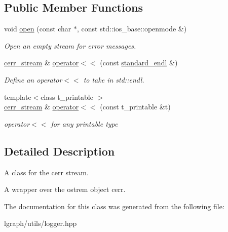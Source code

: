 \subsection*{Public Member Functions}
\begin{DoxyCompactItemize}
\item 
void \hyperlink{classlgraph_1_1utils_1_1cerr__stream_aaec9df1b58756fcda596e29bbfcefeac}{open} (const char $\ast$, const std\+::ios\+\_\+base\+::openmode \&)\hypertarget{classlgraph_1_1utils_1_1cerr__stream_aaec9df1b58756fcda596e29bbfcefeac}{}\label{classlgraph_1_1utils_1_1cerr__stream_aaec9df1b58756fcda596e29bbfcefeac}

\begin{DoxyCompactList}\small\item\em Open an empty stream for error messages. \end{DoxyCompactList}\item 
\hyperlink{classlgraph_1_1utils_1_1cerr__stream}{cerr\+\_\+stream} \& \hyperlink{classlgraph_1_1utils_1_1cerr__stream_afd3014b9b67c23c7c86513c0f4969723}{operator$<$$<$} (const \hyperlink{classlgraph_1_1utils_1_1cerr__stream_a8b7e7603a4e656bd2d9196ae0f530c7b}{standard\+\_\+endl} \&)\hypertarget{classlgraph_1_1utils_1_1cerr__stream_afd3014b9b67c23c7c86513c0f4969723}{}\label{classlgraph_1_1utils_1_1cerr__stream_afd3014b9b67c23c7c86513c0f4969723}

\begin{DoxyCompactList}\small\item\em Define an operator$<$$<$ to take in std\+::endl. \end{DoxyCompactList}\item 
{\footnotesize template$<$class t\+\_\+printable $>$ }\\\hyperlink{classlgraph_1_1utils_1_1cerr__stream}{cerr\+\_\+stream} \& \hyperlink{classlgraph_1_1utils_1_1cerr__stream_afd9313105917714104d41bb3990ab81c}{operator$<$$<$} (const t\+\_\+printable \&t)\hypertarget{classlgraph_1_1utils_1_1cerr__stream_afd9313105917714104d41bb3990ab81c}{}\label{classlgraph_1_1utils_1_1cerr__stream_afd9313105917714104d41bb3990ab81c}

\begin{DoxyCompactList}\small\item\em operator$<$$<$ for any printable type \end{DoxyCompactList}\end{DoxyCompactItemize}


\subsection{Detailed Description}
A class for the cerr stream. 

A wrapper over the ostrem object cerr. 

The documentation for this class was generated from the following file\+:\begin{DoxyCompactItemize}
\item 
lgraph/utils/logger.\+hpp\end{DoxyCompactItemize}
